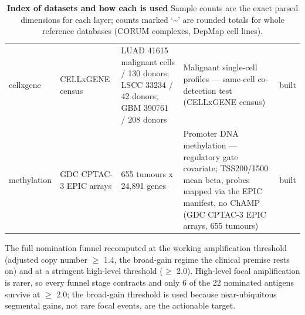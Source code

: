\documentclass[times, twoside]{zHenriquesLab-StyleBioRxiv}
\begin{document}
\begin{table}[tbp]
{\begin{tabular}{@{}p{}p{}p{}p{}p{}@{}}
cellxgene & CELLxGENE census & LUAD 41615 malignant cells / 130 donors; LSCC 33234 / 42 donors; GBM 390761 / 208 donors & Malignant single-cell profiles --- same-cell co-detection test (CELLxGENE census) & built \\
methylation & GDC CPTAC-3 EPIC arrays & 655 tumours x 24,891 genes & Promoter DNA methylation --- regulatory gate covariate; TSS200/1500 mean beta, probes mapped via the EPIC manifest, no ChAMP (GDC CPTAC-3 EPIC arrays, 655 tumours) & built \\
\bottomrule
\end{tabular}
}
\caption{\textbf{Index of datasets and how each is used} Sample counts are the exact parsed dimensions for each layer; counts marked `\textasciitilde{}' are rounded totals for whole reference databases (CORUM complexes, DepMap cell lines).}
\label{tab:dataindex}
\end{table}
The full nomination funnel recomputed at the working amplification threshold (adjusted copy number $\geq$ 1.4, the broad-gain regime the clinical premise rests on) and at a stringent high-level threshold ($\geq$ 2.0). High-level focal amplification is rarer, so every funnel stage contracts and only 6 of the 22 nominated antigens survive at $\geq$ 2.0; the broad-gain threshold is used because near-ubiquitous segmental gains, not rare focal events, are the actionable target.
\end{document}
